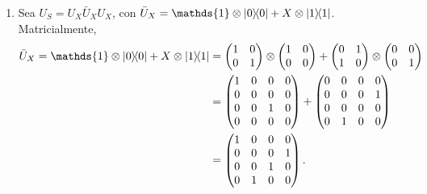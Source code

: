 \documentclass{scrartcl}
\DeclareRobustCommand{\[}{\begin{equation}}
\DeclareRobustCommand{\]}{\end{equation}}
\begin{document}
\begin{enumerate}
    \item Sea $U_S = U_X \bar{U}_X U_X$, con $\bar{U}_X = \mathds{1} \otimes \dyad{0}{0} + X \otimes \dyad{1}{1}$. Matricialmente,
    \begin{align}
            \bar{U}_X = \mathds{1} \otimes \dyad{0}{0} + X \otimes \dyad{1}{1} &=
            \begin{pmatrix}
                \mqty{\pmat{0}}
            \end{pmatrix}
            \otimes
            \begin{pmatrix}
                1 & 0 \\
                0 & 0
            \end{pmatrix}
            +
            \begin{pmatrix}
                \mqty{\pmat{1}}
            \end{pmatrix}
            \otimes
            \begin{pmatrix}
                0 & 0 \\
                0 & 1
            \end{pmatrix} \\
            &=
            \begin{pmatrix}
                1 & 0 & 0 & 0 \\
                0 & 0 & 0 & 0 \\
                0 & 0 & 1 & 0 \\
                0 & 0 & 0 & 0
            \end{pmatrix}
            +
            \begin{pmatrix}
                0 & 0 & 0 & 0 \\
                0 & 0 & 0 & 1 \\
                0 & 0 & 0 & 0 \\
                0 & 1 & 0 & 0
            \end{pmatrix} \\
            &=
            \begin{pmatrix}
                1 & 0 & 0 & 0 \\
                0 & 0 & 0 & 1 \\
                0 & 0 & 1 & 0 \\
                0 & 1 & 0 & 0
            \end{pmatrix}.
        \end{align}
        

\end{enumerate}
\end{document}
